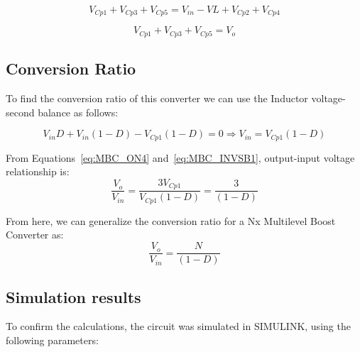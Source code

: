 \begin{equation}
	V_{Cp1} + V_{Cp3} + V_{Cp5} = V_{in} - V{L} + V_{Cp2} + V_{Cp4}
	\label{eq:MBC_OFF3}
\end{equation}

\begin{equation}
	V_{Cp1} + V_{Cp3} + V_{Cp5} = V_o
	\label{eq:MBC_OFF4}
\end{equation}

\subsection{Conversion Ratio}

To find the conversion ratio of this converter we can use the Inductor voltage-second balance as follows:

\begin{equation}
	V_{in}D + V_{in}(1-D) - V_{Cp1}(1-D)= 0 
	\Rightarrow
	V_{in} = V_{Cp1}(1-D)
	\label{eq:MBC_INVSB1}
\end{equation}

From Equations~\ref{eq:MBC_ON4} and~\ref{eq:MBC_INVSB1}, output-input voltage relationship is:
\begin{equation}
	\frac{V_o}{V_{in}} = \frac{3V_{Cp1}}{V_{Cp1}(1-D)} = \frac{3}{(1-D)}
	\label{eq:MBC_INVSB2}
\end{equation}

From here, we can generalize the conversion ratio for a Nx Multilevel Boost Converter as:
\begin{equation}
	\frac{V_o}{V_{in}} = \frac{N}{(1-D)}
	\label{eq:MBC_INVSB3}
\end{equation}

\subsection{Simulation results}

To confirm the calculations, the circuit was simulated in SIMULINK, using the following parameters: 

